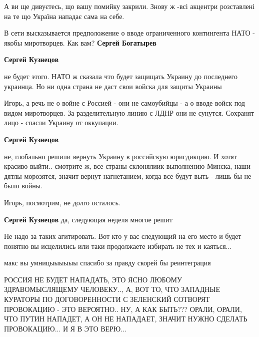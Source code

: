 \begin{itemize}
А ви ще дивуєтесь, що вашу помийку закрили. Знову ж -всі акцентри розставлені
на те що Україна нападає сама на себе.


В сети высказывается предположение о вводе ограниченного контингента НАТО - якобы миротворцев. Как вам?
\textbf{Сергей Богатырев}

\begin{itemize} %
\textbf{Сергей Кузнецов} 

не будет этого. НАТО ж сказала что будет защищать Украину до последнего
украинца. Но ни одна страна не даст свои войска для защиты Украины


Игорь, а речь не о войне с Россией - они не самоубийцы - а о вводе войск под
видом миротворцев. За разделительную линию с ЛДНР они не сунутся. Сохранят лицо
- спасли Украину от оккупации.

\textbf{Сергей Кузнецов} 

не, глобально решили вернуть Украину в российскую юрисдикцию. И хотят красиво
выйти.. смотрите ж, все страны склонялиик выполнению Минска, наши дятлы
морозятся, значит вернут нагнетанием, когда все будут выть - лишь бы не было
войны.

Игорь, посмотрим, не долго осталось.

\textbf{Сергей Кузнецов} да, следующая неделя многое решит
\end{itemize} %


Не надо за таких агитировать. Вот кто у вас следующий на его место и будет
понятно вы исцелились или таки продолжаете избирать не тех и каяться...

макс вы умницыыыыыы спасибо за правду скорей бы реинтеграция


РОССИЯ НЕ БУДЕТ НАПАДАТЬ, ЭТО ЯСНО ЛЮБОМУ ЗДРАВОМЫСЛЯЩЕМУ ЧЕЛОВЕКУ.., А, ВОТ
ТО, ЧТО ЗАПАДНЫЕ КУРАТОРЫ ПО ДОГОВОРЕННОСТИ С ЗЕЛЕНСКИЙ СОТВОРЯТ ПРОВОКАЦИЮ - ЭТО
ВЕРОЯТНО.. НУ, А КАК БЫТЬ??? ОРАЛИ, ОРАЛИ, ЧТО ПУТИН НАПАДЕТ, А ОН НЕ
НАПАДАЕТ, ЗНАЧИТ НУЖНО СДЕЛАТЬ ПРОВОКАЦИЮ... И Я В ЭТО ВЕРЮ...



\end{itemize}
